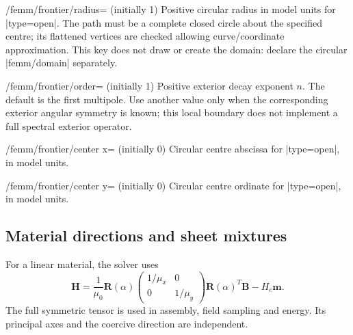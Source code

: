 \begin{key}{/femm/frontier/radius= (initially 1)}
Positive circular radius in model units for |type=open|. The path must be a
complete closed circle about the specified centre; its flattened vertices are
checked allowing curve/coordinate approximation. This key does not draw or
create the domain: declare the circular |femm/domain| separately.
\end{key}
\begin{key}{/femm/frontier/order= (initially 1)}
Positive exterior decay exponent $n$. The default is the first multipole.
Use another value only when the corresponding exterior angular symmetry is
known; this local boundary does not implement a full spectral exterior operator.
\end{key}
\begin{key}{/femm/frontier/center x= (initially 0)}
Circular centre abscissa for |type=open|, in model units.
\end{key}
\begin{key}{/femm/frontier/center y= (initially 0)}
Circular centre ordinate for |type=open|, in model units.
\end{key}

\subsection{Material directions and sheet mixtures}
For a linear material, the solver uses
\[
 \mathbf H=\frac{1}{\mu_0}\mathbf R(\alpha)
 \begin{pmatrix}1/\mu_x&0\\0&1/\mu_y\end{pmatrix}
 \mathbf R(\alpha)^T\mathbf B-H_c\mathbf m.
\]
The full symmetric tensor is used in assembly, field sampling and energy.
Its principal axes and the coercive direction are independent.

